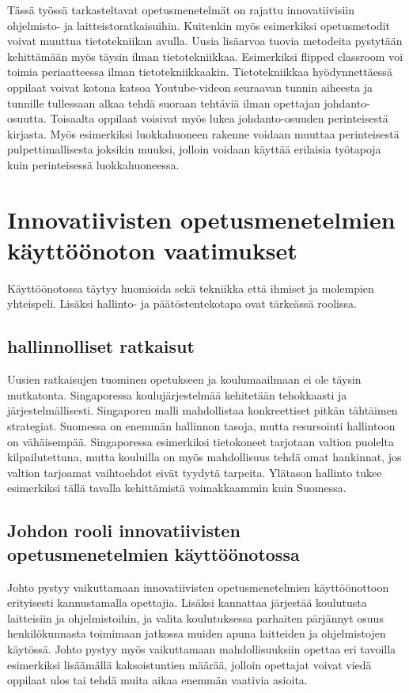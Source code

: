 \documentclass[utf8,bachelor]{gradu3}
\begin{document}
Tässä työssä tarkasteltavat opetusmenetelmät on rajattu innovatiivisiin ohjelmisto- ja laitteistoratkaisuihin. Kuitenkin myös esimerkiksi opetusmetodit voivat muuttua tietotekniikan avulla. Uusia lisäarvoa tuovia metodeita pystytään kehittämään myös täysin ilman tietotekniikkaa. Esimerkiksi flipped classroom voi toimia periaatteessa ilman tietotekniikkaakin. Tietotekniikkaa hyödynnettäessä oppilaat voivat kotona katsoa Youtube-videon seuraavan tunnin aiheesta ja tunnille tullessaan alkaa tehdä suoraan tehtäviä ilman opettajan johdanto-osuutta. Toisaalta oppilaat voisivat myös lukea johdanto-osuuden perinteisestä kirjasta. \parencite[][]{flipped} Myös esimerkiksi luokkahuoneen rakenne voidaan muuttaa perinteisestä pulpettimallisesta joksikin muuksi, jolloin voidaan käyttää erilaisia työtapoja kuin perinteisessä luokkahuoneessa.


\section{Innovatiivisten opetusmenetelmien käyttöönoton vaatimukset}
Käyttöönotossa täytyy huomioida sekä tekniikka että ihmiset ja molempien yhteispeli. Lisäksi hallinto- ja päätöstentekotapa ovat tärkeässä roolissa.
\subsection{hallinnolliset ratkaisut}
Uusien ratkaisujen tuominen opetukseen ja koulumaailmaan ei ole täysin mutkatonta. Singaporessa koulujärjestelmää kehitetään tehokkaasti ja järjestelmällisesti. Singaporen malli mahdollistaa konkreettiset pitkän tähtäimen strategiat. Suomessa on enemmän hallinnon tasoja, mutta resursointi hallintoon on vähäisempää. Singaporessa esimerkiksi tietokoneet tarjotaan valtion puolelta kilpailutettuna, mutta kouluilla on myös mahdollisuus tehdä omat hankinnat, jos valtion tarjoamat vaihtoehdot eivät tyydytä tarpeita. Ylätason hallinto tukee esimerkiksi tällä tavalla kehittämistä voimakkaammin kuin Suomessa. \parencite[][]{koulunArki} 

\subsection{Johdon rooli innovatiivisten opetusmenetelmien käyttöönotossa}
Johto pystyy vaikuttamaan innovatiivisten opetusmenetelmien käyttöönottoon erityisesti kannustamalla opettajia. Lisäksi kannattaa järjestää koulutusta laitteisiin ja ohjelmistoihin, ja valita koulutuksessa parhaiten pärjännyt osuus henkilökunnasta toimimaan jatkossa muiden apuna laitteiden ja ohjelmistojen käytössä. Johto pystyy myös vaikuttamaan mahdollisuuksiin opettaa eri tavoilla esimerkiksi lisäämällä kaksoistuntien määrää, jolloin opettajat voivat viedä oppilaat ulos tai tehdä muita aikaa enemmän vaativia asioita. 
 
\end{document}
